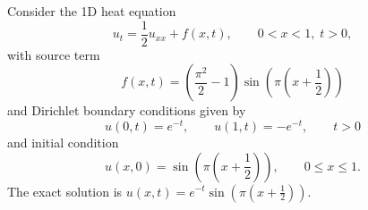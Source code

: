 \documentclass{homework}
\begin{document}
	\maketitle
	
	Consider the 1D heat equation
	\begin{equation*}
		u_t = \frac{1}{2}u_{xx} + f(x,t), \qquad 0 < x < 1, \;t > 0,
	\end{equation*}
	with source term
	\begin{equation*}
		f(x,t) = \left(\frac{\pi^2}{2}-1\right)\sin\left(\pi\left(x+\frac{1}{2}\right)\right)
	\end{equation*}
	and Dirichlet boundary conditions given by
	\begin{equation*}
		u(0,t) = e^{-t}, \qquad u(1,t) = -e^{-t}, \qquad t > 0
	\end{equation*}
	and initial condition
	\begin{equation*}
		u(x,0) = \sin\left(\pi\left(x+\frac{1}{2}\right)\right), \qquad 0\le x\le 1.
	\end{equation*}
	The exact solution is $u(x,t) = e^{-t}\sin\left(\pi\left(x+\frac{1}{2}\right)\right)$.
	
	\question
	
\end{document}
